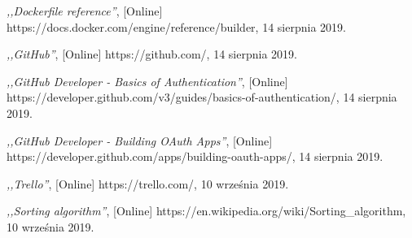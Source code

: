 \begin{thebibliography}{99}
  \emph{,,Dockerfile reference''}, [Online] https://docs.docker.com/engine/reference/builder, 14 sierpnia 2019.

 \emph{,,GitHub''}, [Online] https://github.com/, 14 sierpnia 2019.

 \emph{,,GitHub Developer - Basics of Authentication''}, [Online] https://developer.github.com/v3/guides/basics-of-authentication/, 14 sierpnia 2019.

 \emph{,,GitHub Developer - Building OAuth Apps''}, [Online] https://developer.github.com/apps/building-oauth-apps/, 14 sierpnia 2019.

 \emph{,,Trello''}, [Online] https://trello.com/, 10 września 2019.

 \emph{,,Sorting algorithm''}, [Online] https://en.wikipedia.org/wiki/Sorting\_algorithm, 10 września 2019.

\end{thebibliography}
\clearpage




